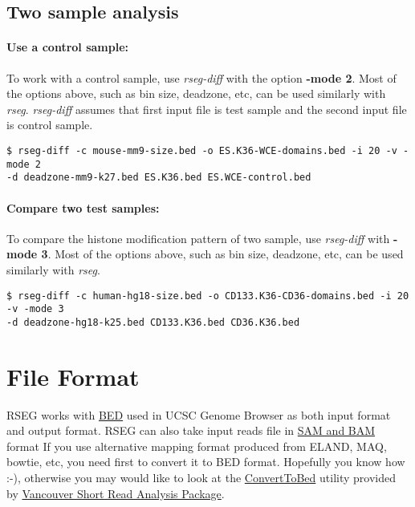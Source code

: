 \documentclass[11pt]{report}
\begin{document}
\subsection{Two sample analysis}
\label{sec:use-rseg-diff}


\paragraph{Use a control sample:}
To work with a control sample, use \textit{rseg-diff} with the option
\textbf{-mode 2}. Most of the options above, such as bin size, deadzone, etc,
can be used similarly with \textit{rseg}. \textit{rseg-diff} assumes that first
input file is test sample and the second input file is control sample.
\begin{verbatim}
$ rseg-diff -c mouse-mm9-size.bed -o ES.K36-WCE-domains.bed -i 20 -v -mode 2
-d deadzone-mm9-k27.bed ES.K36.bed ES.WCE-control.bed
\end{verbatim}

\paragraph{Compare two test samples:}
To compare the histone modification pattern of two sample, use
\textit{rseg-diff} with \textbf{-mode 3}. Most of the options above, such as bin size,
deadzone, etc, can be used similarly with \textit{rseg}.
\begin{verbatim}
$ rseg-diff -c human-hg18-size.bed -o CD133.K36-CD36-domains.bed -i 20 -v -mode 3 
-d deadzone-hg18-k25.bed CD133.K36.bed CD36.K36.bed
\end{verbatim}

\section{File Format}
\label{sec:file-format}

RSEG works with \href{http://genome.ucsc.edu/FAQ/FAQformat.html#format1}{BED}
used in UCSC Genome Browser as both input format and output format. RSEG can
also take input reads file in \href{https://github.com/samtools/samtools}{SAM
  and BAM} format If you use alternative mapping format produced from ELAND, MAQ,
bowtie, etc, you need first to convert it to BED format. Hopefully you know how
:-), otherwise you may would like to look at the
\href{http://sourceforge.net/apps/mediawiki/vancouvershortr/index.php?title=ConvertToBed}
     {ConvertToBed} utility provided by
     \href{http://sourceforge.net/projects/vancouvershortr/}{Vancouver Short
       Read Analysis Package}.
\end{document}
